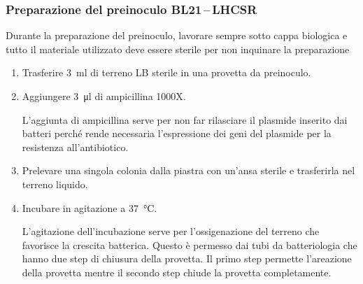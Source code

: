 \subsubsection{Preparazione del preinoculo BL21\texorpdfstring{\,--\,}{--}LHCSR}
\begin{Attenzione}
	Durante la preparazione del preinoculo, lavorare sempre sotto cappa biologica e tutto il materiale utilizzato deve essere sterile per non inquinare la preparazione
\end{Attenzione}
\begin{enumerate}
	\item Trasferire \qty{3}{\ml} di terreno LB sterile in una provetta da preinoculo.
	\item Aggiungere \qty{3}{\micro\litre} di ampicillina 1000X.
	      \begin{Note}
		      L'aggiunta di ampicillina serve per non far rilasciare il plasmide inserito dai batteri perché rende necessaria l'espressione dei geni del plasmide per la resistenza all'antibiotico.
	      \end{Note}
	\item Prelevare una singola colonia dalla piastra con un’ansa sterile e trasferirla nel terreno liquido.
	\item Incubare in agitazione a \qty{37}{\celsius}.
	      \begin{Note}
		      L'agitazione dell'incubazione serve per l'ossigenazione del terreno che favorisce la crescita batterica. Questo è permesso dai tubi da batteriologia che hanno due step di chiusura della provetta. Il primo step permette l'areazione della provetta mentre il secondo step chiude la provetta completamente.
	      \end{Note}
\end{enumerate}

